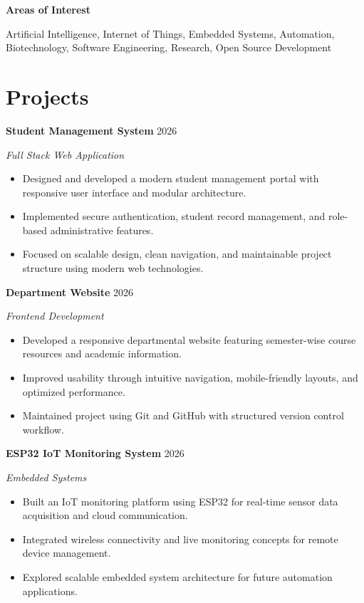 \documentclass[10pt,a4paper]{article}
\newcommand{\resumeItem}[1]{
\item\small{#1}
}
\newcommand{\resumeProject}[4]{
\textbf{#1}
\hfill
{\small #2}

\textit{#3}

#4

\vspace{6pt}
}
\begin{document}
\vspace{3pt}

\textbf{Areas of Interest}

Artificial Intelligence,
Internet of Things,
Embedded Systems,
Automation,
Biotechnology,
Software Engineering,
Research,
Open Source Development


\section*{Projects}

\resumeProject
{Student Management System}
{2026}
{Full Stack Web Application}
{
\begin{itemize}[leftmargin=*]

\resumeItem{Designed and developed a modern student management portal with responsive user interface and modular architecture.}

\resumeItem{Implemented secure authentication, student record management, and role-based administrative features.}

\resumeItem{Focused on scalable design, clean navigation, and maintainable project structure using modern web technologies.}

\end{itemize}
}


\resumeProject
{Department Website}
{2026}
{Frontend Development}
{
\begin{itemize}[leftmargin=*]

\resumeItem{Developed a responsive departmental website featuring semester-wise course resources and academic information.}

\resumeItem{Improved usability through intuitive navigation, mobile-friendly layouts, and optimized performance.}

\resumeItem{Maintained project using Git and GitHub with structured version control workflow.}

\end{itemize}
}


\resumeProject
{ESP32 IoT Monitoring System}
{2026}
{Embedded Systems}
{
\begin{itemize}[leftmargin=*]

\resumeItem{Built an IoT monitoring platform using ESP32 for real-time sensor data acquisition and cloud communication.}

\resumeItem{Integrated wireless connectivity and live monitoring concepts for remote device management.}

\resumeItem{Explored scalable embedded system architecture for future automation applications.}

\end{itemize}
}
\end{document}
